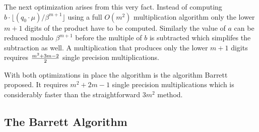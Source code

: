 \documentclass[b5paper]{book}
\begin{document}
The next optimization arises from this very fact.  Instead of computing $b \cdot \lfloor (q_0 \cdot \mu) / \beta^{m+1} \rfloor$ using a full
$O(m^2)$ multiplication algorithm only the lower $m+1$ digits of the product have to be computed.  Similarly the value of $a$ can
be reduced modulo $\beta^{m+1}$ before the multiple of $b$ is subtracted which simplifes the subtraction as well.  A multiplication that produces 
only the lower $m+1$ digits requires ${m^2 + 3m - 2} \over 2$ single precision multiplications.  

With both optimizations in place the algorithm is the algorithm Barrett proposed.  It requires $m^2 + 2m - 1$ single precision multiplications which
is considerably faster than the straightforward $3m^2$ method.  

\subsection{The Barrett Algorithm}
\end{document}
